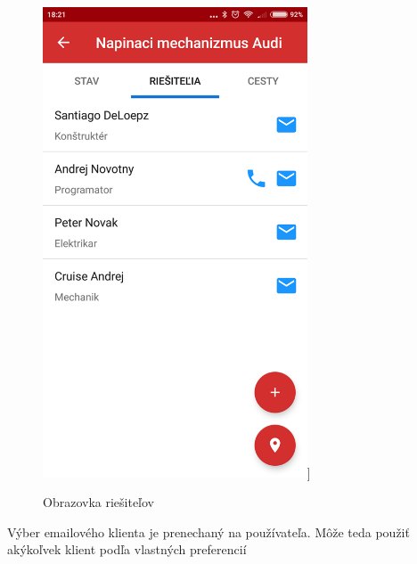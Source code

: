 \vspace{10pt}
\begin{figure}[H]

    \begin{center}
        \begin{minipage}{0.7\linewidth}
            \begin{center}
               \includegraphics[width=0.7\textwidth]{images/screenz/riesitelia.png}]   
                \caption{Obrazovka riešiteľov}
                \label{obr3.9}
            \end{center}
        \end{minipage}
    \end{center}
    
\end{figure}
\vspace{10pt}

Výber emailového klienta je prenechaný na používateľa. Môže teda použiť akýkoľvek klient podľa vlastných preferencií

